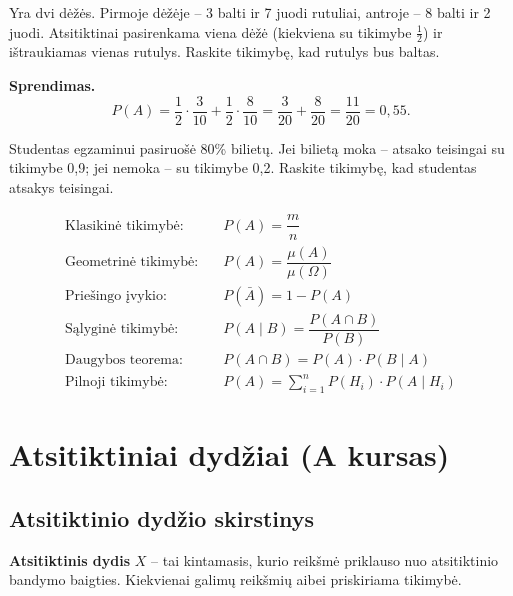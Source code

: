 \begin{example}
Yra dvi dėžės. Pirmoje dėžėje – 3 balti ir 7 juodi rutuliai, antroje – 8 balti ir 2 juodi. Atsitiktinai pasirenkama viena dėžė (kiekviena su tikimybe $\tfrac{1}{2}$) ir ištraukiamas vienas rutulys. Raskite tikimybę, kad rutulys bus baltas.

\textbf{Sprendimas.}
\[
P(A) = \frac{1}{2} \cdot \frac{3}{10} + \frac{1}{2} \cdot \frac{8}{10} = \frac{3}{20} + \frac{8}{20} = \frac{11}{20} = 0{,}55.
\]
\end{example}

\begin{exercise}
Studentas egzaminui pasiruošė 80\% bilietų. Jei bilietą moka – atsako teisingai su tikimybe 0{,}9; jei nemoka – su tikimybe 0{,}2. Raskite tikimybę, kad studentas atsakys teisingai.
\end{exercise}

\begin{tcolorbox}[title={Pagrindinės formulės – santrauka}, colback=blue!5, colframe=blue!40]
\begin{align*}
\text{Klasikinė tikimybė:} \quad & P(A) = \dfrac{m}{n} \\[6pt]
\text{Geometrinė tikimybė:} \quad & P(A) = \dfrac{\mu(A)}{\mu(\Omega)} \\[6pt]
\text{Priešingo įvykio:} \quad & P(\bar{A}) = 1 - P(A) \\[6pt]
\text{Sąlyginė tikimybė:} \quad & P(A \mid B) = \dfrac{P(A \cap B)}{P(B)} \\[6pt]
\text{Daugybos teorema:} \quad & P(A \cap B) = P(A) \cdot P(B \mid A) \\[6pt]
\text{Pilnoji tikimybė:} \quad & P(A) = \displaystyle\sum_{i=1}^{n} P(H_i) \cdot P(A \mid H_i)
\end{align*}
\end{tcolorbox}

\section{Atsitiktiniai dydžiai (A kursas)}

\subsection{Atsitiktinio dydžio skirstinys}

\begin{definition}
\textbf{Atsitiktinis dydis} $X$ – tai kintamasis, kurio reikšmė priklauso nuo atsitiktinio bandymo baigties. Kiekvienai galimų reikšmių aibei priskiriama tikimybė.
\end{definition}

